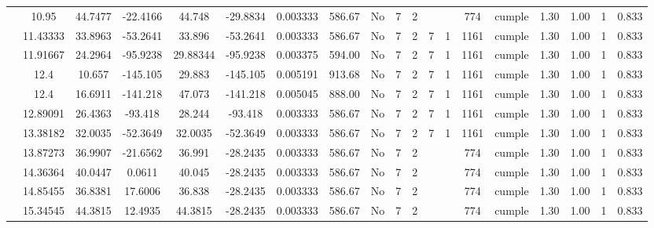\begin{table}[H]
{\begin{tabular}{|c|c|c|c|c|c|r|c|c|c|c|c|c|c|c|c|c|c|c|}
\cline{2-19}    & 10.95 & 44.7477 & -22.4166 & 44.748 & -29.8834 & 0.003333 & 586.67 & No  & 7   & 2   &     &     & 774 & \cellcolor[rgb]{ .776,  .937,  .808}cumple & 1.30 & 1.00 & 1   & 0.833 \bigstrut\\
\cline{2-19}    & 11.43333 & 33.8963 & -53.2641 & 33.896 & -53.2641 & 0.003333 & 586.67 & No  & 7   & 2   & 7   & 1   & 1161 & \cellcolor[rgb]{ .776,  .937,  .808}cumple & 1.30 & 1.00 & 1   & 0.833 \bigstrut\\
\cline{2-19}    & 11.91667 & 24.2964 & -95.9238 & 29.88344 & -95.9238 & 0.003375 & 594.00 & No  & 7   & 2   & 7   & 1   & 1161 & \cellcolor[rgb]{ .776,  .937,  .808}cumple & 1.30 & 1.00 & 1   & 0.833 \bigstrut\\
\cline{2-19}    & \cellcolor[rgb]{ .851,  .882,  .949}12.4 & 10.657 & -145.105 & 29.883 & -145.105 & 0.005191 & 913.68 & No  & 7   & 2   & 7   & 1   & 1161 & \cellcolor[rgb]{ .776,  .937,  .808}cumple & 1.30 & 1.00 & 1   & 0.833 \bigstrut\\
\cline{2-19}    & \cellcolor[rgb]{ .851,  .882,  .949}12.4 & 16.6911 & -141.218 & 47.073 & -141.218 & 0.005045 & 888.00 & No  & 7   & 2   & 7   & 1   & 1161 & \cellcolor[rgb]{ .776,  .937,  .808}cumple & 1.30 & 1.00 & 1   & 0.833 \bigstrut\\
\cline{2-19}    & 12.89091 & 26.4363 & -93.418 & 28.244 & -93.418 & 0.003333 & 586.67 & No  & 7   & 2   & 7   & 1   & 1161 & \cellcolor[rgb]{ .776,  .937,  .808}cumple & 1.30 & 1.00 & 1   & 0.833 \bigstrut\\
\cline{2-19}    & 13.38182 & 32.0035 & -52.3649 & 32.0035 & -52.3649 & 0.003333 & 586.67 & No  & 7   & 2   & 7   & 1   & 1161 & \cellcolor[rgb]{ .776,  .937,  .808}cumple & 1.30 & 1.00 & 1   & 0.833 \bigstrut\\
\cline{2-19}    & 13.87273 & 36.9907 & -21.6562 & 36.991 & -28.2435 & 0.003333 & 586.67 & No  & 7   & 2   &     &     & 774 & \cellcolor[rgb]{ .776,  .937,  .808}cumple & 1.30 & 1.00 & 1   & 0.833 \bigstrut\\
\cline{2-19}    & 14.36364 & 40.0447 & 0.0611 & 40.045 & -28.2435 & 0.003333 & 586.67 & No  & 7   & 2   &     &     & 774 & \cellcolor[rgb]{ .776,  .937,  .808}cumple & 1.30 & 1.00 & 1   & 0.833 \bigstrut\\
\cline{2-19}    & 14.85455 & 36.8381 & 17.6006 & 36.838 & -28.2435 & 0.003333 & 586.67 & No  & 7   & 2   &     &     & 774 & \cellcolor[rgb]{ .776,  .937,  .808}cumple & 1.30 & 1.00 & 1   & 0.833 \bigstrut\\
\cline{2-19}    & 15.34545 & 44.3815 & 12.4935 & 44.3815 & -28.2435 & 0.003333 & 586.67 & No  & 7   & 2   &     &     & 774 & \cellcolor[rgb]{ .776,  .937,  .808}cumple & 1.30 & 1.00 & 1   & 0.833 \bigstrut\\

\end{tabular}}
\end{table}
